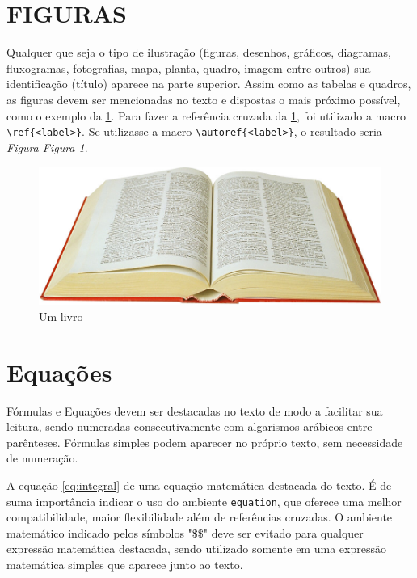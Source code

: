 \documentclass[
  12pt,		%
  a4paper,	%
  openright,%
  oneside,	%
  chapter=TITLE,		%
  section=TITLE,		%
  english,	%
  french,	%
  spanish,	%
  brazil
]{abntex2}
\begin{document}
         
         
         \section{FIGURAS}

            
                Qualquer que seja o tipo de ilustração (figuras, desenhos, gráficos, diagramas, fluxogramas, fotografias, mapa, planta, quadro, imagem entre outros) sua identificação (título) aparece na parte superior. Assim como as tabelas e quadros, as figuras devem ser mencionadas no texto e dispostas o mais próximo possível, como o exemplo da \ref{figura}. Para fazer a referência cruzada da \ref{figura}, foi utilizado a macro \verb|\ref{<label>}|. Se utilizasse a macro \verb|\autoref{<label>}|, o resultado seria \textit{Figura Figura 1}.
                
                \begin{figure}[h]
                    \centering
                    \caption{Um livro}
                    \label{figura}
                    \includegraphics{book}
                    \par
                \end{figure}
                
    
        \section {Equações}
        
        Fórmulas e Equações devem ser destacadas no texto de modo a facilitar sua leitura, sendo numeradas consecutivamente com algarismos arábicos entre parênteses. Fórmulas simples podem aparecer no próprio texto, sem necessidade de numeração.
        
        A equação \ref{eq:integral} de uma equação matemática destacada do texto. É de suma importância indicar o uso do ambiente \verb|equation|, que oferece uma melhor compatibilidade, maior flexibilidade além de referências cruzadas. O ambiente matemático indicado pelos símbolos "\$\$" deve ser evitado para qualquer expressão matemática destacada, sendo utilizado somente em uma expressão matemática simples que aparece junto ao texto.
        
\end{document}
